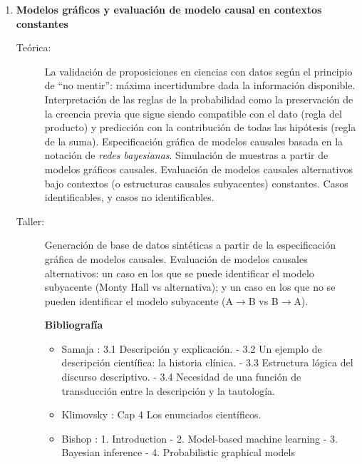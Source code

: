 \documentclass[10pt]{article}
\begin{document}
\begin{enumerate}

\item \textbf{Modelos gráficos y evaluación de modelo causal en contextos constantes}
\vspace{-0.15cm}
\begin{description}
\item[Teórica:] La validación de proposiciones en ciencias con datos según el principio de ``no mentir'': máxima incertidumbre dada la información disponible.
Interpretación de las reglas de la probabilidad como la preservación de la creencia previa que sigue siendo compatible con el dato (regla del producto) y predicción con la contribución de todas las hipótesis (regla de la suma). Especificación gráfica de modelos causales basada en la notación de \emph{redes bayesianas}. Simulación de muestras a partir de modelos gráficos causales. Evaluación de modelos causales alternativos bajo contextos (o estructuras causales subyacentes) constantes. Casos identificables, y casos no identificables.
\item[Taller:] Generación de base de datos sintéticas a partir de la especificación gráfica de modelos causales.
Evaluación de modelos causales alternativos: un caso en los que se puede identificar el modelo subyacente (Monty Hall vs alternativa); y un caso en los que no se pueden identificar el modelo subyacente (A$\rightarrow$B vs B$\rightarrow$A).
\item[] \textbf{Bibliografía}
\begin{itemize}
\item Samaja \cite{samaja1999-epistemologiaMetodologia}: 3.1 Descripción y explicación. - 3.2 Un ejemplo de descripción científica: la historia clínica. - 3.3 Estructura lógica del discurso descriptivo. - 3.4 Necesidad de una función de transducción entre la descripción y la tautología.
\item Klimovsky \cite{klimovsky1994-desventuras}: Cap 4 Los enunciados científicos.
\item Bishop \cite{bishop2013-mbmlpaper}: 1. Introduction - 2. Model-based machine learning - 3. Bayesian inference - 4. Probabilistic graphical models
\end{itemize}
\end{description}


\end{enumerate}
\end{document}
